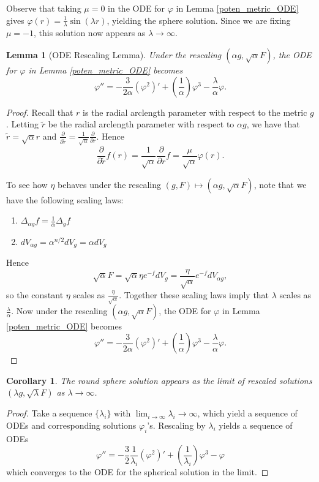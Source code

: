 \documentclass[12pt, a4paper, reqno, oneside]{amsart}
\renewcommand{\phi}{\varphi}
\numberwithin{equation}{section}
\theoremstyle{plain}
\newtheorem{lemma}[theorem]{Lemma}
\newtheorem{corollary}[theorem]{Corollary}
\theoremstyle{definition}
\theoremstyle{plain}
\begin{document}
Observe that taking $\mu=0$ in the ODE for $\phi$ in Lemma \ref{poten_metric_ODE} gives $\phi(r) = \tfrac{1}{\lambda}\sin(\lambda r)$, yielding the sphere solution. Since we are fixing $\mu=-1$, this solution now appears as $\lambda\to\infty$. 

\begin{lemma}[ODE Rescaling Lemma]\label{ODE_rescaling_lemma}
  Under the rescaling $(\alpha g,\sqrt{\alpha}F)$, the ODE for $\phi$ in Lemma \ref{poten_metric_ODE} becomes
  \begin{equation}\label{rescaled_phi_ODE}
      \phi''=-\frac{3}{2\alpha}(\phi^2)'+\left(\frac{1}{\alpha}\right)\phi^{3}-\frac{\lambda}{\alpha}\phi.
  \end{equation}
\end{lemma}
\begin{proof}
  Recall that $r$ is the radial arclength parameter with respect to the metric $g$. Letting $\tilde{r}$ be the radial arclength parameter with respect to $\alpha g$, we have that $\tilde{r}=\sqrt{\alpha}r$ and $\frac{\partial}{\partial \tilde{r}}=\frac{1}{\sqrt{\alpha}}\frac{\partial}{\partial r}$. Hence
  \[
    \frac{\partial}{\partial \tilde{r}}f(r) = \frac{1}{\sqrt{\alpha}}\frac{\partial}{\partial r} f = \frac{\mu}{\sqrt{\alpha}}\phi(r).
  \]

  To see how $\eta$ behaves under the rescaling $(g,F)\mapsto (\alpha g,\sqrt{\alpha}F)$, note that we have the following scaling laws:
  \begin{enumerate}
    \item $\Delta_{\alpha g}f=\frac{1}{\alpha}\Delta_{g}f$
    \item $dV_{\alpha g} = \alpha^{n/2} dV_{g} = \alpha dV_{g}$
  \end{enumerate}
  Hence
  \[
      \sqrt{\alpha} F = \sqrt{\alpha} \eta e^{-f}dV_{g} = \frac{\eta}{\sqrt{\alpha}} e^{-f}dV_{\alpha g},
  \]
  so the constant $\eta$ scales as $\frac{\eta}{\sqrt{\alpha}}$. Together these scaling laws imply that $\lambda$ scales as $\frac{\lambda}{\alpha}$. Now under the rescaling $(\alpha g,\sqrt{\alpha}F)$, the ODE for $\phi$ in Lemma \ref{poten_metric_ODE} becomes
  \begin{equation}
      \phi''=-\frac{3}{2\alpha}(\phi^2)'+\left(\frac{1}{\alpha}\right)\phi^{3}-\frac{\lambda}{\alpha}\phi.
  \end{equation}
\end{proof}

\begin{corollary}\label{sphere_solution_corollary}
  The round sphere solution appears as the limit of rescaled solutions $(\lambda g,\sqrt{\lambda}F)$ as $\lambda\to\infty$.
\end{corollary}
\begin{proof}
  Take a sequence $\{\lambda_i\}$ with $\lim_{i\to\infty}\lambda_{i}\to\infty$, which yield a sequence of ODEs and corresponding solutions $\phi_{i}$'s. Rescaling by $\lambda_{i}$ yields a sequence of ODEs
  \[
      \phi''=-\frac{3}{2}\frac{1}{\lambda_{i}}(\phi^2)'+\left(\frac{1}{\lambda_{i}}\right)\phi^{3}-\phi
  \]
  which converges to the ODE for the spherical solution in the limit. 
\end{proof}
\end{document}

